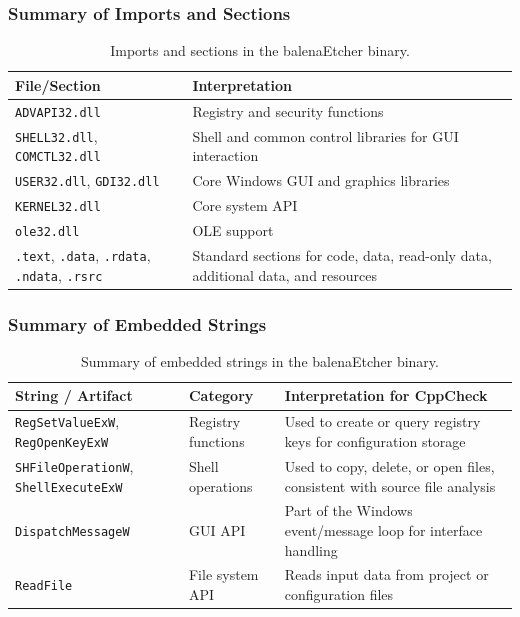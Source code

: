 \documentclass{article}
\begin{document}
\subsubsection{Summary of Imports and Sections}
\begin{table}[H]
  \centering
  \begin{tabular}{|p{4cm}|p{8cm}|}
    \hline
    \textbf{File/Section} & \textbf{Interpretation} \\
    \hline
    \texttt{ADVAPI32.dll} & Registry and security functions \\
    \hline
    \texttt{SHELL32.dll}, \texttt{COMCTL32.dll} & Shell and common control libraries for GUI interaction \\
    \hline
    \texttt{USER32.dll}, \texttt{GDI32.dll} & Core Windows GUI and graphics libraries \\
    \hline
    \texttt{KERNEL32.dll} & Core system API \\
    \hline
    \texttt{ole32.dll} & OLE support \\
    \hline
    \texttt{.text}, \texttt{.data}, \texttt{.rdata}, \texttt{.ndata}, \texttt{.rsrc} & Standard sections for code, data, read-only data, additional data, and resources \\
    \hline
  \end{tabular}
  \caption{Imports and sections in the balenaEtcher binary.}
  \label{tab:balenaEtcher-imports}
\end{table}

\subsubsection{Summary of Embedded Strings}
\begin{table}[H]
  \centering
  \begin{tabular}{|p{5cm}|p{3cm}|p{7cm}|}
    \hline
    \textbf{String / Artifact} & \textbf{Category} & \textbf{Interpretation for CppCheck} \\
    \hline
    \texttt{RegSetValueExW}, \texttt{RegOpenKeyExW} & Registry functions & Used to create or query registry keys for configuration storage \\
    \hline
    \texttt{SHFileOperationW}, \texttt{ShellExecuteExW} & Shell operations & Used to copy, delete, or open files, consistent with source file analysis \\
    \hline
    \texttt{DispatchMessageW} & GUI API & Part of the Windows event/message loop for interface handling \\
    \hline
    \texttt{ReadFile} & File system API & Reads input data from project or configuration files \\
    \hline
  \end{tabular}
  \caption{Summary of embedded strings in the balenaEtcher binary.}
  \label{tab:balenaEtcher-strings}
\end{table}
\end{document}
